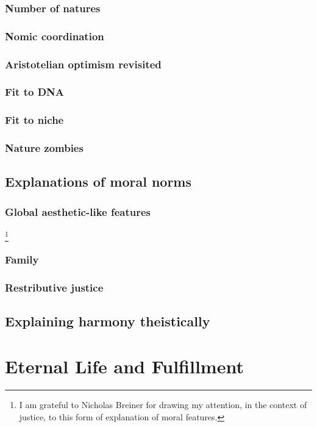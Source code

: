 \subsection{Number of natures}
\subsection{Nomic coordination}
\subsection{Aristotelian optimism revisited}
\subsection{Fit to DNA}
\subsection{Fit to niche}
\subsection{Nature zombies}
\section{Explanations of moral norms}
\subsection{Global aesthetic-like features}\footnote{I am grateful to Nicholas Breiner for drawing my attention, in the context of
justice, to this form of explanation of moral features.}
\subsection{Family}
\subsection{Restributive justice}

\section{Explaining harmony theistically}
\chaptertail

\def\mychapter{X}

\chapter{Eternal Life and Fulfillment}\label{ch:eternal-life}
\chaptertail

